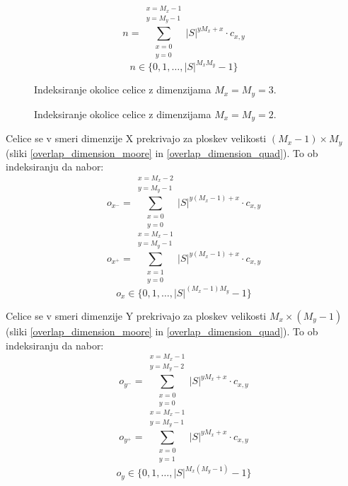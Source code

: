 \documentclass[12pt,a4paper,openany,twoside]{book}
\begin{document}
\begin{equation}
n = \sum_{\substack{x=0 \\ y=0}}^{\substack{x=M_x-1 \\ y=M_y-1}} |S|^{y M_x + x} \cdot c_{x,y}
\end{equation}
\begin{equation}
n \in \{0, 1, \dots, |S|^{M_x M_y}-1\}
\end{equation}

\begin{figure}[htb]
\centerline{}
\caption[Indeksiranje okolice \(3 \times 3\).]{Indeksiranje okolice celice z dimenzijama \(M_x=M_y=3\).}
\label{neighborhood_index_moore}
\end{figure}

\begin{figure}[htb]
\centerline{}
\caption[Indeksiranje okolice \(2 \times 2\).]{Indeksiranje okolice celice z dimenzijama \(M_x=M_y=2\).}
\label{neighborhood_index_quad}
\end{figure}

Celice se v smeri dimenzije X prekrivajo za ploskev velikosti \((M_x-1) \times M_y\) (sliki \ref{overlap_dimension_moore} in \ref{overlap_dimension_quad}).
To ob indeksiranju da nabor:
\begin{equation}
o_{x^-} = \sum_{\substack{x=0 \\ y=0}}^{\substack{x=M_x-2 \\ y=M_y-1}} |S|^{y (M_x-1) + x} \cdot c_{x,y}
\end{equation}
\begin{equation}
o_{x^+} = \sum_{\substack{x=1 \\ y=0}}^{\substack{x=M_x-1 \\ y=M_y-1}} |S|^{y (M_x-1) + x} \cdot c_{x,y}
\end{equation}
\begin{equation}
o_x \in \{0, 1, \dots, |S|^{(M_x-1)M_y}-1\}
\end{equation}

Celice se v smeri dimenzije Y prekrivajo za ploskev velikosti \(M_x \times (M_y-1)\) (sliki \ref{overlap_dimension_moore} in \ref{overlap_dimension_quad}).
To ob indeksiranju da nabor:
\begin{equation}
o_{y^-} = \sum_{\substack{x=0 \\ y=0}}^{\substack{x=M_x-1 \\ y=M_y-2}} |S|^{y M_x + x} \cdot c_{x,y}
\end{equation}
\begin{equation}
o_{y^+} = \sum_{\substack{x=0 \\ y=1}}^{\substack{x=M_x-1 \\ y=M_y-1}} |S|^{y M_x + x} \cdot c_{x,y}
\end{equation}
\begin{equation}
o_y \in \{0, 1, \dots, |S|^{M_x(M_y-1)}-1\}
\end{equation}
\end{document}
